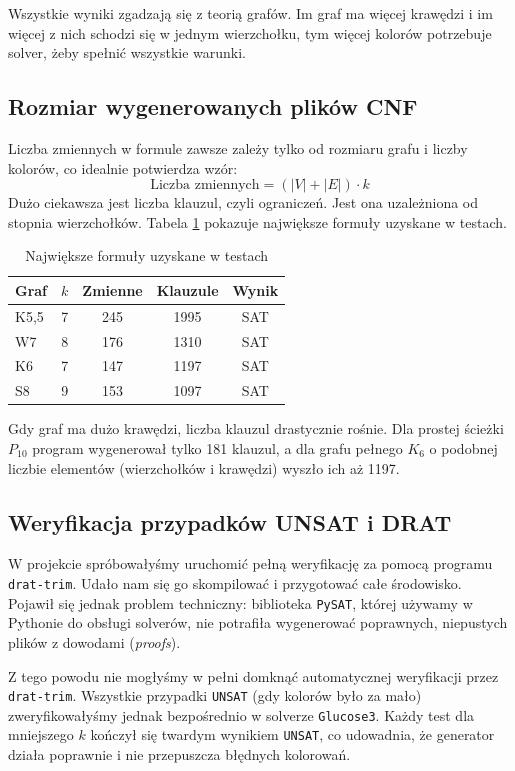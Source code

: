 \documentclass[11pt,a4paper]{article}
\theoremstyle{definition}
\begin{document}
Wszystkie wyniki zgadzają się z teorią grafów. Im graf ma więcej krawędzi i im więcej z nich schodzi się w jednym wierzchołku, tym więcej kolorów potrzebuje solver, żeby spełnić wszystkie warunki.

\subsection{Rozmiar wygenerowanych plików CNF}
Liczba zmiennych w formule zawsze zależy tylko od rozmiaru grafu i liczby kolorów, co idealnie potwierdza wzór:
\[
\text{Liczba zmiennych} = (|V| + |E|) \cdot k
\]
Dużo ciekawsza jest liczba klauzul, czyli ograniczeń. Jest ona uzależniona od stopnia wierzchołków. Tabela \ref{tab:rozmiary} pokazuje największe formuły uzyskane w testach.

\begin{table}[H]
\centering
\caption{Największe formuły uzyskane w testach}\label{tab:rozmiary}
\begin{tabular}{lcccc}
\toprule
Graf & $k$ & Zmienne & Klauzule & Wynik \\
\midrule
K5,5 & 7 & 245 & 1995 & SAT \\
W7 & 8 & 176 & 1310 & SAT \\
K6 & 7 & 147 & 1197 & SAT \\
S8 & 9 & 153 & 1097 & SAT \\
\bottomrule
\end{tabular}
\end{table}

Gdy graf ma dużo krawędzi, liczba klauzul drastycznie rośnie. Dla prostej ścieżki $P_{10}$ program wygenerował tylko 181 klauzul, a dla grafu pełnego $K_6$ o podobnej liczbie elementów (wierzchołków i krawędzi) wyszło ich aż 1197. 

\subsection{Weryfikacja przypadków UNSAT i DRAT}
W projekcie spróbowałyśmy uruchomić pełną weryfikację za pomocą programu \texttt{drat-trim}. Udało nam się go skompilować i przygotować całe środowisko. Pojawił się jednak problem techniczny: biblioteka \texttt{PySAT}, której używamy w Pythonie do obsługi solverów, nie potrafiła wygenerować poprawnych, niepustych plików z dowodami (\textit{proofs}).

Z tego powodu nie mogłyśmy w pełni domknąć automatycznej weryfikacji przez \texttt{drat-trim}. Wszystkie przypadki \texttt{UNSAT} (gdy kolorów było za mało) zweryfikowałyśmy jednak bezpośrednio w solverze \texttt{Glucose3}. Każdy test dla mniejszego $k$ kończył się twardym wynikiem \texttt{UNSAT}, co udowadnia, że generator działa poprawnie i nie przepuszcza błędnych kolorowań.
\end{document}

